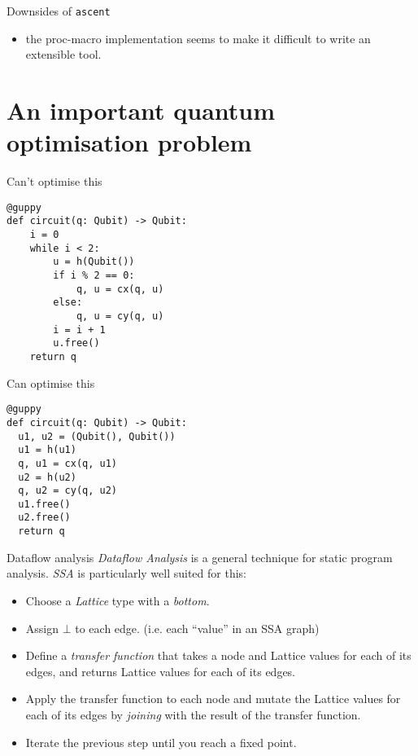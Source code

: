 \documentclass[presentation]{beamer}
\begin{document}
\begin{frame}[label={sec:orgb3662ae},fragile]{Downsides of \texttt{ascent}}
 \begin{itemize}
\item the proc-macro implementation seems to make it difficult to write an extensible tool.
\end{itemize}
\end{frame}
\section{An important quantum optimisation problem}
\label{sec:org9f557be}
\begin{frame}[label={sec:org337a0f6},fragile]{Can't optimise this}
 \begin{verbatim}
@guppy
def circuit(q: Qubit) -> Qubit:
    i = 0
    while i < 2:
        u = h(Qubit())
        if i % 2 == 0:
            q, u = cx(q, u)
        else:
            q, u = cy(q, u)
        i = i + 1
        u.free()
    return q
\end{verbatim}
\end{frame}
\begin{frame}[label={sec:org4a345aa},fragile]{Can optimise this}
 \begin{verbatim}
@guppy
def circuit(q: Qubit) -> Qubit:
  u1, u2 = (Qubit(), Qubit())
  u1 = h(u1)
  q, u1 = cx(q, u1)
  u2 = h(u2)
  q, u2 = cy(q, u2)
  u1.free()
  u2.free()
  return q
\end{verbatim}
\end{frame}
\begin{frame}[label={sec:org09a7548}]{Dataflow analysis}
\emph{Dataflow Analysis} is a general technique for static program analysis. \emph{SSA} is particularly well suited for this:
\begin{itemize}
\item Choose a \emph{Lattice} type with a \emph{bottom}.
\item Assign \(\bot\) to each edge. (i.e. each ``value'' in an SSA graph)
\item Define a \emph{transfer function} that takes a node and Lattice values for each of its edges, and returns Lattice values for each of its edges.
\item Apply the transfer function to each node and mutate the Lattice values for each of its edges by \emph{joining} with the result of the transfer function.
\item Iterate the previous step until you reach a fixed point.
\end{itemize}
\end{frame}
\end{document}
